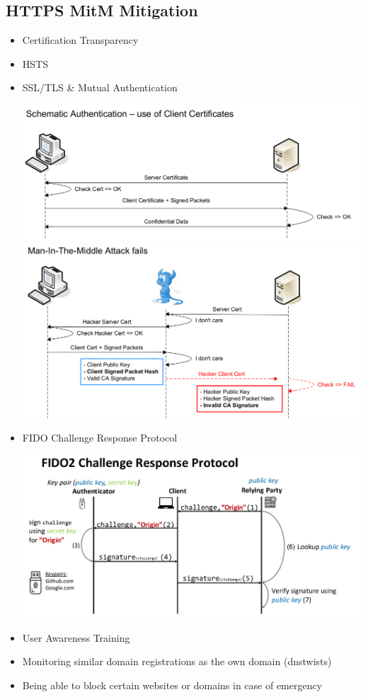 \subsection{HTTPS MitM Mitigation}
\begin{itemize}
  \item Certification Transparency
  \item HSTS
  \item SSL/TLS \& Mutual Authentication \newline
  \begin{center}
    \includegraphics[width=\textwidth]{resources/07-https-mitam-mitigation-ssl.png} 
    \includegraphics[width=\textwidth]{resources/07-https-mitam-mitigation-ssl-2.png} 
  \end{center}
  \item FIDO Challenge Response Protocol \newline
  \begin{center}
    \includegraphics[width=\textwidth]{resources/07-https-mitam-mitigation-fido2.png} 
  \end{center}
  \item User Awareness Training
  \item Monitoring similar domain registrations as the own domain (dnstwists)
  \item Being able to block certain websites or domains in case of emergency
\end{itemize}


